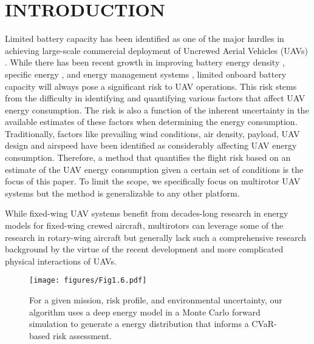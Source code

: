 \documentclass[letterpaper, 10 pt, conference]{ieeeconf}
\begin{document}
\section{INTRODUCTION}
Limited battery capacity has been identified as one of the major hurdles in achieving large-scale commercial deployment of Uncrewed Aerial Vehicles (UAVs) \cite{murray2015flying}. While there has been recent growth in improving battery energy density \cite{li2019practical,kerman2017practical}, specific energy \cite{stolaroff2018energy}, and energy management systems \cite{boukoberine2019critical}, limited onboard battery capacity will always pose a significant risk to UAV operations. This risk stems from the difficulty in identifying and quantifying various factors that affect UAV energy consumption. The risk is also a function of the inherent uncertainty in the available estimates of these factors when determining the energy consumption. Traditionally, factors like prevailing wind conditions, air density, payload, UAV design and airspeed \cite{thibbotuwawa2018factors} have been identified as considerably affecting UAV energy consumption. Therefore, a method that quantifies the flight risk based on an estimate of the UAV energy consumption given a certain set of conditions is the focus of this paper. To limit the scope, we specifically focus on multirotor UAV systems but the method is generalizable to any other platform. 

While fixed-wing UAV systems benefit from decades-long research in energy models for fixed-wing crewed aircraft, multirotors can leverage some of the research in rotary-wing aircraft but generally lack such a comprehensive research background by the virtue of the recent development and more complicated physical interactions of UAVs.    
\begin{figure}
    \centering
    \texttt{[image: figures/Fig1.6.pdf]} 
    \caption{For a given mission, risk profile, and environmental uncertainty, our algorithm uses a deep energy model in a Monte Carlo forward simulation to generate a energy distribution that informs a CVaR-based risk assessment.}
\label{fig:full_overview}
\end{figure}
\end{document}
